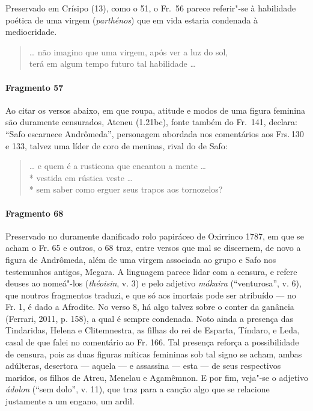 {{\small Preservado em Crísipo (13), como o 51, o Fr.~56 parece referir"-se à habilidade
poética de uma virgem (\textit{parthénos}) que em vida estaria condenada à
mediocridade.}

\begin{verse}
\ldots{} não imagino que uma virgem, após ver a luz \qb{}do sol,\\
terá em algum tempo futuro tal habilidade \ldots{}
\end{verse}

\paragraph{Fragmento 57}

{\small Ao citar os versos abaixo, em que roupa, atitude e modos de uma figura feminina são
duramente censurados, Ateneu (1.21bc), fonte também do Fr.~141, declara: ``Safo
escarnece Andrômeda”, personagem abordada nos comentários aos Frs.\,130 e 133, talvez uma líder de coro de meninas, rival do de Safo:}

\begin{verse}
\ldots{} e quem é a rusticona que encantou a mente \ldots{}\\*
vestida em rústica veste \ldots{}\\*
sem saber como erguer seus trapos aos tornozelos?
\end{verse}

\paragraph{Fragmento 68} 

{\small Preservado no duramente danificado rolo papiráceo de Oxirrinco 1787, em que se acham o Fr. 65 e outros, o 68 traz, entre versos que mal se discernem, de novo a figura de Andrômeda, além de uma virgem associada ao grupo e Safo nos testemunhos antigos, Megara.  A linguagem parece lidar com a censura, e refere deuses ao nomeá"-los (\textit{théoisin}, v. 3) e pelo adjetivo \textit{mákaira} (``venturosa'', v. 6), que noutros fragmentos traduzi, e que só aos imortais pode ser atribuído --- no Fr. 1, é dado a Afrodite. No verso 8, há algo talvez sobre o conter da ganância (Ferrari, 2011, p. 158), a qual é sempre condenada. Noto ainda a presença das Tindaridas, Helena e Clitemnestra, as filhas do rei de Esparta, Tíndaro, e Leda, casal de que falei no comentário ao Fr. 166. Tal presença reforça a possibilidade de censura, pois as duas figuras míticas femininas sob tal signo se acham, ambas adúlteras, desertora --- aquela --- e assassina --- esta --- de seus respectivos maridos, os filhos de Atreu, Menelau e Agamêmnon. E por fim, veja"-se o adjetivo \textit{ádolon} (``sem dolo'', v. 11), que traz para a canção algo que se relacione justamente a um engano, um ardil.}

}

